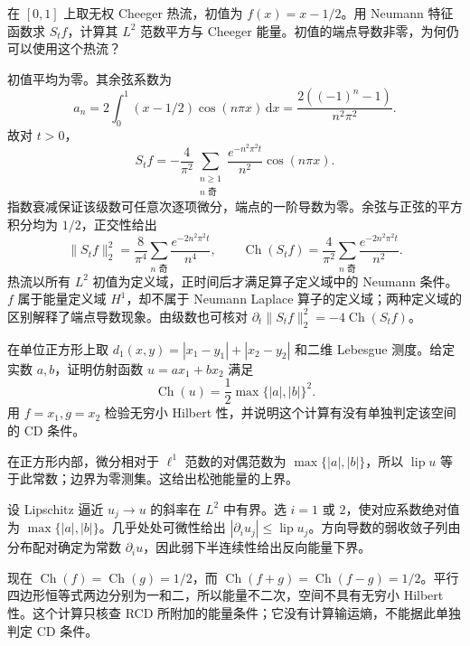 \begin{exercise}\label{g3:ex:C-neumann-linear-initial}
	在 \([0,1]\) 上取无权 Cheeger 热流，初值为 \(f(x)=x-1/2\)。用 Neumann 特征函数求 \(S_tf\)，计算其 \(L^2\) 范数平方与 Cheeger 能量。初值的端点导数非零，为何仍可以使用这个热流？
\end{exercise}
\begin{solution}
	初值平均为零。其余弦系数为
	\[
		a_n=2\int_0^1(x-1/2)\cos(n\pi x)\,\mathrm dx
		=\frac{2((-1)^n-1)}{n^2\pi^2}.
	\]
	故对 \(t>0\)，
	\[
		S_tf=-\frac4{\pi^2}\sum_{\substack{n\ge1\\n\text{ 奇}}}
		 \frac{e^{-n^2\pi^2t}}{n^2}\cos(n\pi x).
	\]
	指数衰减保证该级数可任意次逐项微分，端点的一阶导数为零。余弦与正弦的平方积分均为 \(1/2\)，正交性给出
	\[
		\|S_tf\|_2^2=\frac8{\pi^4}\sum_{n\text{ 奇}}\frac{e^{-2n^2\pi^2t}}{n^4},
		\qquad
		\operatorname{Ch}(S_tf)=\frac4{\pi^2}\sum_{n\text{ 奇}}\frac{e^{-2n^2\pi^2t}}{n^2}.
	\]
	热流以所有 \(L^2\) 初值为定义域，正时间后才满足算子定义域中的 Neumann 条件。\(f\) 属于能量定义域 \(H^1\)，却不属于 Neumann Laplace 算子的定义域；两种定义域的区别解释了端点导数现象。由级数也可核对 \(\partial_t\|S_tf\|_2^2=-4\operatorname{Ch}(S_tf)\)。
\end{solution}

\begin{exercise}\label{g3:ex:C-taxicab-energy}
	在单位正方形上取 \(d_1(x,y)=|x_1-y_1|+|x_2-y_2|\) 和二维 Lebesgue 测度。给定实数 \(a,b\)，证明仿射函数 \(u=ax_1+bx_2\) 满足
	\[
		\operatorname{Ch}(u)=\frac12\max\{|a|,|b|\}^2.
	\]
	用 \(f=x_1,g=x_2\) 检验无穷小 Hilbert 性，并说明这个计算有没有单独判定该空间的 \(\mathrm{CD}\) 条件。
\end{exercise}
\begin{solution}
	在正方形内部，微分相对于 \(\ell^1\) 范数的对偶范数为 \(\max\{|a|,|b|\}\)，所以 \(\operatorname{lip}u\) 等于此常数；边界为零测集。这给出松弛能量的上界。

	设 Lipschitz 逼近 \(u_j\to u\) 的斜率在 \(L^2\) 中有界。选 \(i=1\) 或 \(2\)，使对应系数绝对值为 \(\max\{|a|,|b|\}\)。几乎处处可微性给出 \(|\partial_i u_j|\le\operatorname{lip}u_j\)。方向导数的弱收敛子列由分布配对确定为常数 \(\partial_i u\)，因此弱下半连续性给出反向能量下界。

	现在 \(\operatorname{Ch}(f)=\operatorname{Ch}(g)=1/2\)，而 \(\operatorname{Ch}(f+g)=\operatorname{Ch}(f-g)=1/2\)。平行四边形恒等式两边分别为一和二，所以能量不二次，空间不具有无穷小 Hilbert 性。这个计算只核查 RCD 所附加的能量条件；它没有计算输运熵，不能据此单独判定 CD 条件。
\end{solution}

